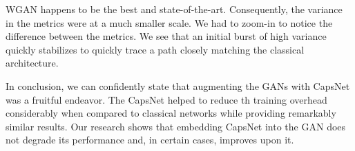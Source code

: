 WGAN happens to be the best and state-of-the-art. Consequently, the variance in the metrics were at a much smaller scale. We had to zoom-in to notice the difference between the metrics. We see that an initial burst of high variance quickly stabilizes to quickly trace a path closely matching the classical architecture.
\par\bigskip

In conclusion, we can confidently state that augmenting the GANs with CapsNet was a fruitful endeavor. The CapsNet helped to reduce th training overhead considerably when compared to classical networks while providing remarkably similar results. Our research shows that embedding CapsNet into the GAN does not degrade its performance and, in certain cases, improves upon it.


